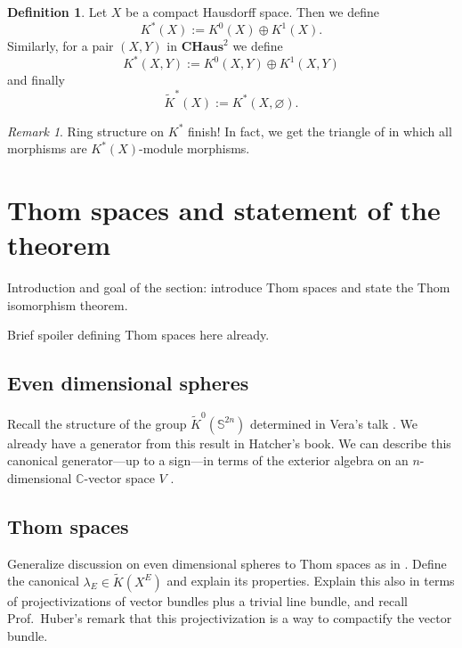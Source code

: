 \documentclass[12pt,a4paper]{amsart}
\theoremstyle{plain}
\theoremstyle{definition}
\newtheorem{defn}[thm]{Definition}
\theoremstyle{remark}
\newtheorem{rem}[thm]{Remark}
\begin{document}
\begin{center}
\end{center}

\begin{defn}
  Let $X$ be a compact Hausdorff space.
  Then we define
  \[ K^{*}(X) := K^{0}(X) \oplus K^{1}(X). \]
  Similarly, for a pair $(X,Y)$ in $\mathbf{CHaus}^{2}$ we define
  \[ K^{*}(X,Y) := K^{0}(X,Y) \oplus K^{1}(X,Y) \]
  and finally
  \[ \tilde{K}^{*}(X) := K^{*}(X,\varnothing). \]
\end{defn}

\begin{rem}
  Ring structure on $K^{*}$ \color{red} finish! \color{black}
  In fact, we get the triangle of \cite[p.~87]{ati67} in which all morphisms are $K^{*}(X)$-module morphisms.
\end{rem}

\section{Thom spaces and statement of the theorem}

Introduction and goal of the section: introduce Thom spaces and state the Thom isomorphism theorem.

Brief spoiler defining Thom spaces here already.

\subsection{Even dimensional spheres}

Recall the structure of the group $\tilde{K}^{0}(\mathbb{S}^{2n})$ determined in Vera's talk \cite[Corollary 2.12]{hat03}.
We already have a generator from this result in Hatcher's book.
We can describe this canonical generator---up to a sign---in terms of the exterior algebra on an $n$-dimensional $\mathbb{C}$-vector space $V$ \cite[p.~99]{ati67}.

\subsection{Thom spaces}

Generalize discussion on even dimensional spheres to Thom spaces as in \cite[p.~100]{ati67}.
Define the canonical $\lambda_{E} \in \tilde{K}(X^{E})$ and explain its properties.
Explain this also in terms of projectivizations of vector bundles plus a trivial line bundle, and recall Prof.~Huber's remark that this projectivization is a way to compactify the vector bundle.
\end{document}
